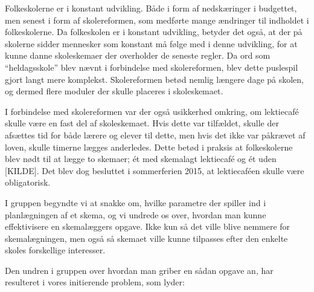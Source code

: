 Folkeskolerne er i konstant udvikling. Både i form af nedskæringer i budgettet, men senest i form af skolereformen, som medførte mange ændringer til indholdet i folkeskolerne. Da folkeskolen er i konstant udvikling, betyder det også, at der på skolerne sidder mennesker som konstant må følge med i denne udvikling, for at kunne danne skoleskemaer der overholder de seneste regler. Da ord som ``heldagsskole'' blev nævnt i forbindelse med skolereformen, blev dette puslespil gjort langt mere komplekst. Skolereformen betød nemlig længere dage på skolen, og dermed flere moduler der skulle placeres i skoleskemaet.

I forbindelse med skolereformen var der også usikkerhed omkring, om lektiecaf\'e skulle være en fast del af skoleskemaet. Hvis dette var tilfældet, skulle der afsættes tid for både lærere og elever til dette, men hvis det ikke var påkrævet af loven, skulle timerne lægges anderledes. Dette betød i praksis at folkeskolerne blev nødt til at lægge to skemaer; \'et med skemalagt lektiecaf\'e og \'et uden [KILDE]. Det blev dog besluttet i sommerferien 2015, at lektiecaf\'een skulle være obligatorisk\cite{Lektiecafe}.

I gruppen begyndte vi at snakke om, hvilke parametre der spiller ind i planlægningen af et skema, og vi undrede os over, hvordan man kunne effektivisere en skemalæggers opgave. Ikke kun så det ville blive nemmere for skemalægningen, men også så skemaet ville kunne tilpasses efter den enkelte skoles forskellige interesser.

Den undren i gruppen over hvordan man griber en sådan opgave an, har resulteret i vores initierende problem, som lyder: 



